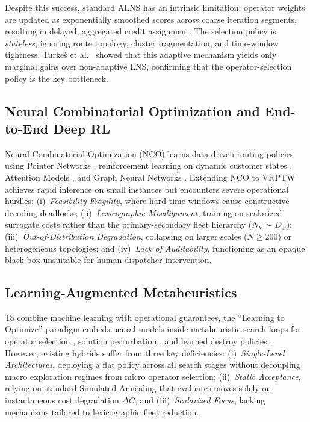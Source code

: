 \documentclass{ieeeaccess}
\newcommand{\NV}{{N_\mathrm{V}}}
\newcommand{\TD}{{D_\mathrm{T}}}
\begin{document}
Despite this success, standard ALNS has an intrinsic limitation: operator weights are updated as exponentially smoothed scores across coarse iteration segments, resulting in delayed, aggregated credit assignment. The selection policy is \emph{stateless}, ignoring route topology, cluster fragmentation, and time-window tightness. Turke\v{s} et al.\ \cite{turkes2021meta} showed that this adaptive mechanism yields only marginal gains over non-adaptive LNS, confirming that the operator-selection policy is the key bottleneck.

\subsection{Neural Combinatorial Optimization and End-to-End Deep RL}
\label{sec:rw_nco}

Neural Combinatorial Optimization (NCO) learns data-driven routing policies using Pointer Networks \cite{vinyals2015pointer, bello2016neural}, reinforcement learning on dynamic customer states \cite{nazari2018reinforcement}, Attention Models \cite{kool2019attention}, and Graph Neural Networks \cite{khalil2017learning, joshi2019efficient}. Extending NCO to VRPTW \cite{falkner2020learning, lin2021deep} achieves rapid inference on small instances but encounters severe operational hurdles: (i)~\emph{Feasibility Fragility}, where hard time windows cause constructive decoding deadlocks; (ii)~\emph{Lexicographic Misalignment}, training on scalarized surrogate costs rather than the primary-secondary fleet hierarchy ($\NV \succ \TD$); (iii)~\emph{Out-of-Distribution Degradation}, collapsing on larger scales ($N \ge 200$) or heterogeneous topologies; and (iv)~\emph{Lack of Auditability}, functioning as an opaque black box unsuitable for human dispatcher intervention.

\subsection{Learning-Augmented Metaheuristics}
\label{sec:rw_hybrid}

To combine machine learning with operational guarantees, the ``Learning to Optimize'' paradigm \cite{bengio2021machine} embeds neural models inside metaheuristic search loops for operator selection \cite{syberfeldt2009reinforcement, lu2020learning}, solution perturbation \cite{chen2019learning}, and learned destroy policies \cite{hottung2020neural}. However, existing hybrids suffer from three key deficiencies: (i)~\emph{Single-Level Architectures}, deploying a flat policy across all search stages without decoupling macro exploration regimes from micro operator selection; (ii)~\emph{Static Acceptance}, relying on standard Simulated Annealing that evaluates moves solely on instantaneous cost degradation $\Delta C$; and (iii)~\emph{Scalarized Focus}, lacking mechanisms tailored to lexicographic fleet reduction.
\end{document}
